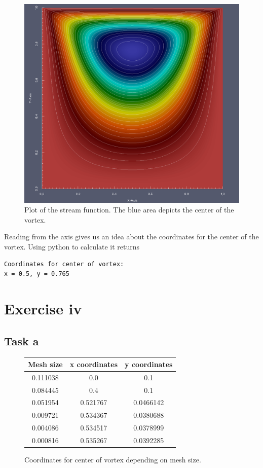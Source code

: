 \documentclass[11pt]{report}
\begin{document}
\begin{figure}[htb]
\center
\includegraphics[scale=0.2]{images/ex3_streamfunction.png}
\caption{Plot of the stream function. The blue area depicts the center of the vortex.}
\label{fig:ex3}
\end{figure}

Reading from the axis gives us an idea about the coordinates for the center of the vortex. Using python to calculate it returns
\begin{verbatim}
Coordinates for center of vortex: 
x = 0.5, y = 0.765

\end{verbatim}


\chapter*{Exercise iv}

\section*{Task a}

\begin{figure}[htb]
\begin{center}
\begin{tabular}{|c|c|c|}
\hline
Mesh size & x coordinates & y coordinates \\ \hline
0.111038 & 0.0  & 0.1           \\ \hline
0.084445 & 0.4  & 0.1            \\ \hline
0.051954 & 0.521767 & 0.0466142            \\ \hline
0.009721 & 0.534367 & 0.0380688           \\ \hline
0.004086 & 0.534517 & 0.0378999           \\ \hline
0.000816 & 0.535267 & 0.0392285           \\ \hline
\end{tabular}
\end {center}
\caption{Coordinates for center of vortex depending on mesh size.}
\end{figure}
\end{document}
